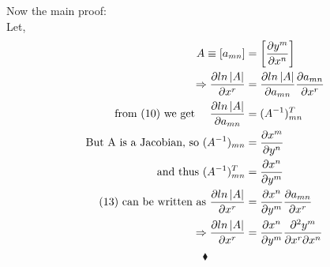Now the main proof:\\
Let, 
\begin{align}
\ A \equiv \left[ a_{mn}\right] &= \left[ \pdv{y^m}{x^n}\right]\\
\Rightarrow \pdv{ln\left|A\right|}{x^r} &= \pdv{ln\left|A\right|}{a_{mn}}\pdv{a_{mn}}{x^r}\\
\text{from (10) we get }\quad \pdv{ln\left|A\right|}{a_{mn}} &= (A^{-1})^T_{mn}\\
\text{But A is a Jacobian, so } (A^{-1})_{mn} &= \pdv{x^m}{y^n}\\
\text{ and thus  }(A^{-1})^T_{mn} &=  \pdv{x^n}{y^m}\\
\text{(13) can be written as }  \pdv{ln\left|A\right|}{x^r} &=  \pdv{x^n}{y^m}\pdv{a_{mn}}{x^r}\\
\Rightarrow \pdv{ln\left|A\right|}{x^r} &=  \pdv{x^n}{y^m}\pdv{y^m}{x^r}{x^n}
\end{align}
$$\blacklozenge$$
\pagebreak[4]

